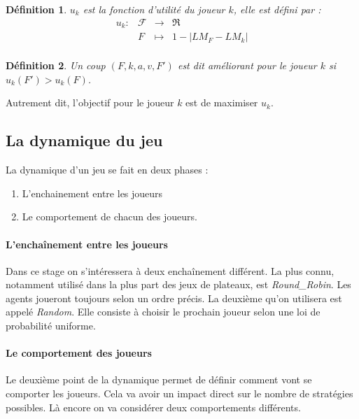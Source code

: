 \documentclass[11pt]{article}
\theoremstyle{defi}
\newtheorem{definition}{Définition}[section]
\theoremstyle{not}
\theoremstyle{prob}
\begin{document}
      \begin{definition}
        $u_k$ est la fonction d'utilité du joueur $k$, elle est défini par :
        $$
        \begin{array}{rclc}
          u_k :  & \mathcal{F} & \longrightarrow & \Re \\
          & F & \longmapsto & 1 - |LM_F - LM_k|\\
        \end{array}
        $$
      \end{definition}

      \begin{definition}
        Un coup $(F, k, a, v, F')$ est dit améliorant pour le joueur $k$ si $u_k(F') > u_k(F)$.
      \end{definition}

      Autrement dit, l'objectif pour le joueur $k$ est de maximiser $u_k$.

    \subsection{La dynamique du jeu}
      La dynamique d'un jeu se fait en deux phases :
      \begin{enumerate}
        \item L'enchainement entre les joueurs
        \item Le comportement de chacun des joueurs.
      \end{enumerate}

      \paragraph{L'enchaînement entre les joueurs}
        Dans ce stage on s'intéressera à deux enchaînement différent.
        La plus connu, notamment utilisé dans la plus part des jeux de plateaux, est \emph{Round\_Robin}.
        Les agents joueront toujours selon un ordre précis.
        La deuxième qu'on utilisera est appelé \emph{Random}. Elle consiste à choisir le prochain joueur selon une loi de probabilité uniforme.

      \paragraph{Le comportement des joueurs}
        Le deuxième point de la dynamique permet de définir comment vont se comporter les joueurs. Cela va avoir un impact direct sur le nombre de stratégies possibles. Là encore on va considérer deux comportements différents.
\end{document}
